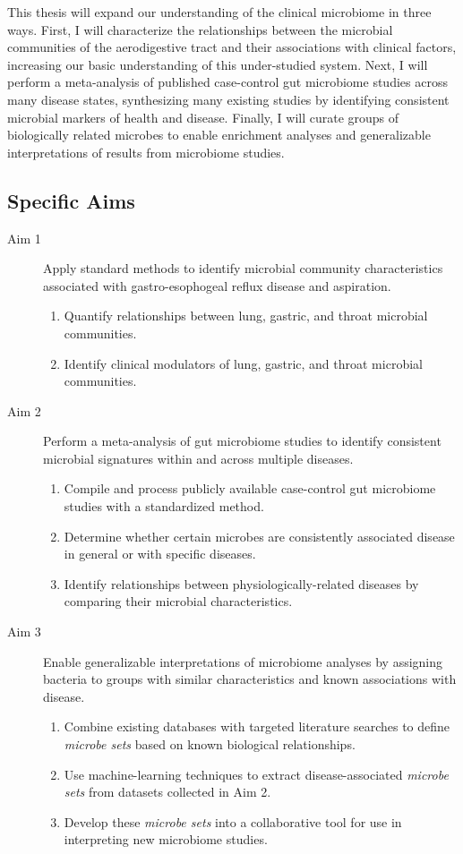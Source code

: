 \documentclass[12pt]{article}
\begin{document}
This thesis will expand our understanding of the clinical microbiome in three ways.
First, I will characterize the relationships between the microbial communities
of the aerodigestive tract and their associations with clinical factors, 
increasing our basic understanding of this under-studied system.
Next, I will perform a meta-analysis of published case-control gut microbiome studies
across many disease states, synthesizing many existing studies by 
identifying consistent microbial markers of health and disease.
Finally, I will curate groups of biologically related microbes
to enable enrichment analyses and generalizable interpretations
of results from microbiome studies. 

\subsection{Specific Aims}
\begin{description}
	\item[Aim 1] Apply standard methods to identify microbial 
	community characteristics associated with gastro-esophogeal reflux 
	disease and aspiration.
	\begin{enumerate}
		\item Quantify relationships between lung, gastric, and throat microbial 
		communities.
		\item Identify clinical modulators of lung, gastric, and 
		throat microbial communities.
	\end{enumerate}
	\item[Aim 2] Perform a meta-analysis of gut 
	microbiome studies to identify consistent microbial signatures 
	within and across multiple diseases.
	\begin{enumerate}
		\item Compile and process publicly available case-control gut 
		microbiome studies with a standardized method.
		\item Determine whether certain microbes are consistently 
		associated disease in general or with specific diseases.
		\item Identify relationships between physiologically-related 
		diseases by comparing their microbial characteristics.
	\end{enumerate}
	\item[Aim 3] Enable generalizable interpretations of microbiome 
	analyses by assigning bacteria to groups with similar characteristics 
	and known associations with disease.
	\begin{enumerate}
		\item Combine existing databases with targeted literature searches 
		to define \textit{microbe sets} based on known biological 
		relationships.
		\item Use machine-learning techniques to extract disease-associated 
		\textit{microbe sets} from datasets collected in Aim 2.
		\item Develop these \textit{microbe sets} into a collaborative 
		tool for use in interpreting new microbiome studies.
	\end{enumerate}
\end{description}
\newpage
\end{document}

